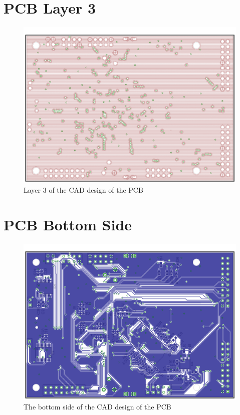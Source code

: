 \section{PCB Layer 3}
\begin{figure}[ht!]
\centering
\includegraphics[angle=90,width=\textwidth,height=\textheight-5cm,keepaspectratio]{Figures/layer3.png} 
\caption{Layer 3 of the CAD design of the PCB}
\label{fig:PCB:Eagle:Bottom}
\end{figure}
\clearpage
\section{PCB Bottom Side}
\begin{figure}[ht!]
\centering
\includegraphics[angle=90,width=\textwidth,height=\textheight-5cm,keepaspectratio]{Figures/ColumbusPCBBottom_GP.png} 
\caption{The bottom side of the CAD design of the PCB}
\label{fig:PCB:Eagle:Bottom}
\end{figure}
\clearpage